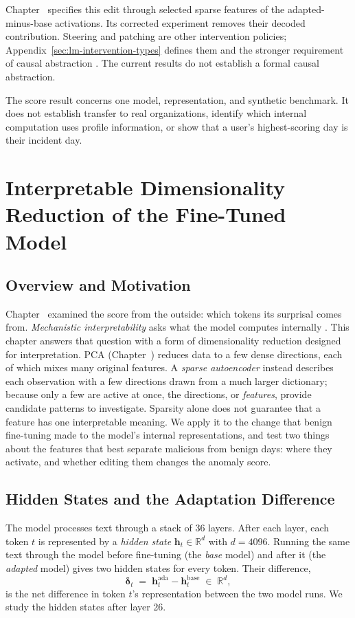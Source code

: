 \documentclass[12pt]{report}
\newcommand{\chref}[1]{Chapter~\uppercase\expandafter{\romannumeral\getrefnumber{#1}}}
\begin{document}
\chref{ch:mech} specifies this edit through selected sparse features
of the adapted-minus-base activations. Its corrected experiment
removes their decoded contribution. Steering and patching are
other intervention policies; Appendix~\ref{sec:lm-intervention-types}
defines them and the stronger requirement of causal abstraction
\cite{geiger2025abstraction}. The current results do not establish
a formal causal abstraction.

The score result concerns one model, representation, and synthetic
benchmark. It does not establish transfer to real organizations,
identify which internal computation uses profile information,
or show that a user's highest-scoring day is their incident day.

\FloatBarrier

\chapter{Interpretable Dimensionality Reduction of the Fine-Tuned Model}
\label{ch:mech}

\section{Overview and Motivation}
\chref{ch:lm} examined the score from the outside: which tokens its surprisal comes
from. \emph{Mechanistic interpretability} asks what the model computes internally
\cite{bricken2023monosemanticity,cunningham2023sparse}. This chapter answers that question with
a form of dimensionality reduction designed for interpretation. PCA (\chref{ch:pca}) reduces
data to a few dense directions, each of which mixes many original features. A \emph{sparse
autoencoder} instead describes each observation with a few directions drawn from a much larger
dictionary; because only a few are active at once, the directions, or \emph{features}, provide candidate patterns to investigate.
Sparsity alone does not guarantee that a feature has one interpretable meaning. We apply it to the change that benign fine-tuning made to the
model's internal representations, and test two things about the features that best separate
malicious from benign days: where they activate, and whether editing them changes the anomaly
score.

\section{Hidden States and the Adaptation Difference}
The model processes text through a stack of 36 layers. After each layer, each token $t$ is
represented by a \emph{hidden state} $\mathbf{h}_t \in \mathbb{R}^{d}$ with $d = 4096$. Running
the same text through the model before fine-tuning (the \emph{base} model) and after it (the
\emph{adapted} model) gives two hidden states for every token. Their difference,
\begin{equation}
\boldsymbol{\delta}_t \;=\; \mathbf{h}^{\mathrm{ada}}_t - \mathbf{h}^{\mathrm{base}}_t
\;\in\; \mathbb{R}^{d},
\label{eq:delta}
\end{equation}
is the net difference in token $t$'s representation between the two model runs. We study the
hidden states after layer 26.
\end{document}
